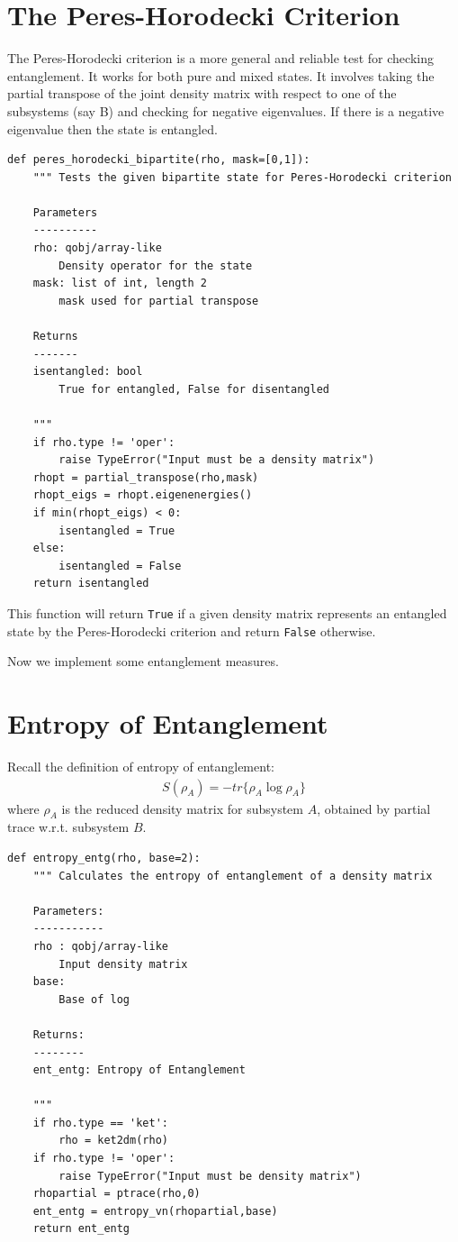 \section{The Peres-Horodecki Criterion}
The Peres-Horodecki criterion is a more general and reliable test for checking entanglement. It works for both pure and mixed states. It involves taking the partial transpose of the joint density matrix with respect to one of the subsystems (say B) and checking for negative eigenvalues. If there is a negative eigenvalue then the state is entangled.
\begin{verbatim}
def peres_horodecki_bipartite(rho, mask=[0,1]):
    """ Tests the given bipartite state for Peres-Horodecki criterion
    
    Parameters
    ----------
    rho: qobj/array-like
        Density operator for the state
    mask: list of int, length 2
        mask used for partial transpose
    
    Returns
    -------
    isentangled: bool
        True for entangled, False for disentangled
    
    """
    if rho.type != 'oper':
        raise TypeError("Input must be a density matrix")
    rhopt = partial_transpose(rho,mask)
    rhopt_eigs = rhopt.eigenenergies()
    if min(rhopt_eigs) < 0:
        isentangled = True
    else:
        isentangled = False
    return isentangled
\end{verbatim}
This function will return \texttt{True} if a given density matrix represents an entangled state by the Peres-Horodecki criterion and return \texttt{False} otherwise.
\\
\par Now we implement some entanglement measures.
\section{Entropy of Entanglement}
Recall the definition of entropy of entanglement:
\begin{align*}
S(\rho_A) = - tr \{ \rho_A \log \rho_A \}
\end{align*}
where $\rho_A$ is the reduced density matrix for subsystem $A$, obtained by partial trace w.r.t. subsystem $B$.
\begin{verbatim}
def entropy_entg(rho, base=2):
    """ Calculates the entropy of entanglement of a density matrix
    
    Parameters:
    -----------
    rho : qobj/array-like
        Input density matrix
    base:
        Base of log
    
    Returns:
    --------
    ent_entg: Entropy of Entanglement
    
    """
    if rho.type == 'ket':
        rho = ket2dm(rho)
    if rho.type != 'oper':
        raise TypeError("Input must be density matrix")
    rhopartial = ptrace(rho,0)
    ent_entg = entropy_vn(rhopartial,base)
    return ent_entg
\end{verbatim}


